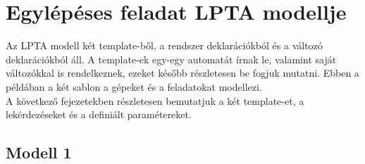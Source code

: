 \documentclass [12pt]{report}
\begin{document}
  

\chapter{Egylépéses feladat LPTA modellje}
    Az LPTA modell két template-ből, a rendszer deklarációkból és a változó deklarációkból áll. A template-ek egy-egy automatát írnak le, valamint saját változókkal is rendelkeznek, ezeket később részletesen be fogjuk mutatni. Ebben a példában a két sablon a gépeket és a feladatokat modellezi.\\
    A következő fejezetekben részletesen bemutatjuk a két template-et, a lekérdezéseket és a definiált paramétereket.
    \section{Modell 1}
\end{document}
